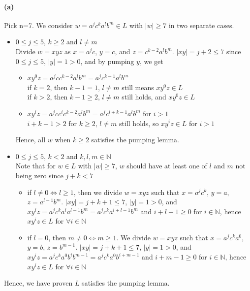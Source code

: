 \documentclass[12pt]{article}
\begin{document}
\paragraph*{(a)} Pick n=7. We consider \(w=a^jc^ka^lb^m \in L\) with \(|w| \geq 7\) in two separate cases.
\begin{itemize}
  \item \(0 \leq j \leq 5\), \(k \geq 2\) and \(l \neq m\)\\
  Divide \(w = xyz\) as \(x = a^jc\), \(y=c\), and \(z=c^{k-2}a^lb^m\). \(|xy| = j+2 \leq 7\) since \(0 \leq j \leq 5\), \(|y| = 1 > 0\), and by pumping \(y\), we get
  \begin{itemize}
    \item \(xy^0z = a^jcc^{k-2}a^lb^m = a^jc^{k-1}a^lb^m\)\\
    if \(k = 2\), then \(k-1 = 1\), \(l \neq m\) still means \(xy^0z \in L\)\\
    if \(k > 2\), then \(k-1 \geq 2\), \(l \neq m\) still holds, and \(xy^0z \in L\)
    \item \(xy^iz = a^jcc^ic^{k-2}a^lb^m = a^jc^{i+k-1}a^lb^m\) for \(i > 1\)\\
    \(i+k-1 > 2\) for \(k \geq 2\), \(l \neq m\) still holds, so \(xy^iz \in L\) for \(i > 1\)
  \end{itemize}
  Hence, all \(w\) when \(k \geq 2\) satisfies the pumping lemma.
  \item \(0 \leq j \leq 5\), \(k < 2\) and \(k, l, m \in \mathbb{N}\)\\
  Note that for \(w \in L\) with \(|w| \geq 7\), \(w\) should have at least one of \(l\) and \(m\) not being zero since \(j+k < 7\)
  \begin{itemize}
    \item if \(l \neq 0 \Leftrightarrow l \geq 1\), then we divide \(w = xyz\) such that \(x=a^jc^k\), \(y=a\), \(z=a^{l-1}b^m\). \(|xy|= j+k+1 \leq 7\), \(|y| = 1>0\), and \(xy^iz = a^jc^ka^ia^{l-1}b^m = a^jc^ka^{i+l-1}b^m\) and \(i+l-1 \geq 0\) for \(i \in \mathbb{N}\), hence \(xy^iz \in L\) for \(\forall i \in \mathbb{N}\)
    \item if \(l = 0\), then \(m \neq 0 \Leftrightarrow m \geq 1\). We divide \(w = xyz\) such that \(x = a^jc^ka^0\), \(y = b\), \(z = b^{m-1}\). \(|xy|= j+k+1 \leq 7\), \(|y| = 1>0\), and \(xy^iz = a^jc^ka^0b^ib^{m-1}= a^jc^ka^0b^{i+m-1}\) and \(i+m-1 \geq 0\) for \(i \in \mathbb{N}\), hence \(xy^iz \in L\) for \(\forall i \in \mathbb{N}\)
  \end{itemize}
\end{itemize}
Hence, we have proven \(L\) satisfies the pumping lemma.
\end{document}
